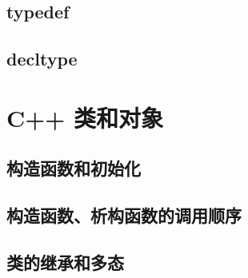 \documentclass{article}
\begin{document}
	\subsection{typedef}
	\subsection{decltype}
	
	\section{C++ 类和对象}
	
	\subsection{构造函数和初始化}
	
	
	\subsection{构造函数、析构函数的调用顺序}
	
	
	
	
	
	
	
	
	\subsection{类的继承和多态}
	
	 
\end{document}
